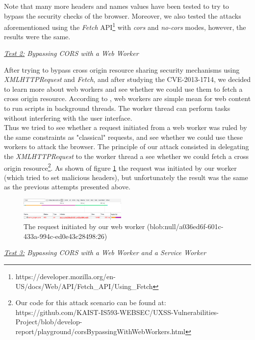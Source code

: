\documentclass[journal]{IEEEtran}
\begin{document}
Note that many more headers and names values have been tested to try to bypass the security checks of the browser. Moreover, we also tested the attacks aforementioned using the \emph{Fetch} API\footnote{https://developer.mozilla.org/en-US/docs/Web/API/Fetch\_API/Using\_Fetch} with \emph{cors} and \emph{no-cors} modes, however, the results were the same.

\medskip

\emph{\underline{Test 2:} Bypassing CORS with a Web Worker}

After trying to bypass cross origin resource sharing security mechanisms using \emph{XMLHTTPRequest} and \emph{Fetch}, and after studying the CVE-2013-1714, we decided to learn more about web workers and see whether we could use them to fetch a cross origin resource. According to \cite{webWorkers}, web workers are simple mean for web content to run scripts in background threads. The worker thread can perform tasks without interfering with the user interface. \\
Thus we tried to see whether a request initiated from a web worker was ruled by the same constraints as "classical" requests, and see whether we could use these workers to attack the browser. The principle of our attack consisted in delegating the \emph{XMLHTTPRequest} to the worker thread a see whether we could fetch a cross origin resource\footnote{Our code for this attack scenario can be found at: https://github.com/KAIST-IS593-WEBSEC/UXSS-Vulnerabilities-Project/blob/develop-report/playground/corsBypassingWithWebWorkers.html}. As shown of figure \ref{fig:corsWithWebWorkers} the request was initiated by our worker (which tried to set malicious headers), but unfortunately the result was the same as the previous attempts presented above. 

\begin{figure}[h]
\centering
\includegraphics[width=0.47\textwidth]{images/corsWithWebWorkers.png}
\caption{The request initiated by our web worker (blob:null/a036ed6f-601c-433a-994c-ed0e43c28498:26)}
\label{fig:corsWithWebWorkers}
\end{figure}


\medskip

\emph{\underline{Test 3:} Bypassing CORS with a Web Worker and a Service Worker}
\end{document}
